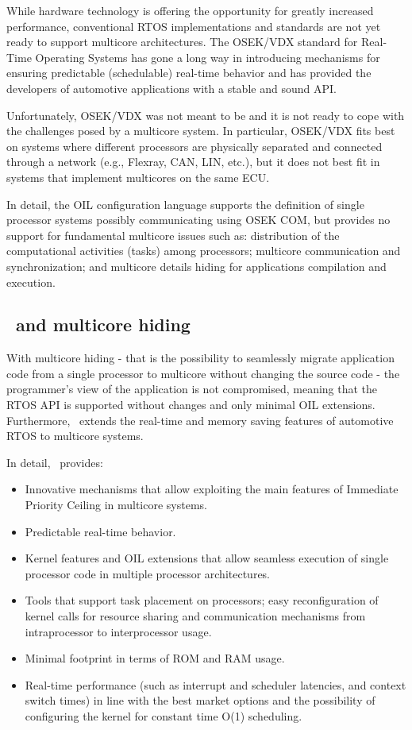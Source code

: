 While hardware technology is offering the opportunity for greatly
increased performance, conventional RTOS implementations and standards
are not yet ready to support multicore architectures. The
OSEK/VDX standard for Real-Time Operating Systems has gone a long way
in introducing mechanisms for ensuring predictable (schedulable)
real-time behavior and has provided the developers of automotive
applications with a stable and sound API.

Unfortunately, OSEK/VDX was not meant to be and it is not ready to
cope with the challenges posed by a multicore system.  In
particular, OSEK/VDX fits best on systems where different processors
are physically separated and connected through a network (e.g.,
Flexray, CAN, LIN, etc.), but it does not best fit in systems that
implement multicores on the same ECU.

In detail, the OIL configuration language supports the definition of
single processor systems possibly communicating using OSEK COM, but
provides no support for fundamental multicore issues such as:
distribution of the computational activities (tasks) among processors;
multicore communication and synchronization; and multicore
details hiding for applications compilation and execution.  

\subsection{\ee\ and multicore hiding}

With multicore hiding - that is the possibility to seamlessly
migrate application code from a single processor to multicore
without changing the source code - the programmer's view of the
application is not compromised, meaning that the RTOS API is supported
without changes and only minimal OIL extensions. Furthermore, \ee\ 
extends the real-time and memory saving features of automotive RTOS to
multicore systems.

In detail, \ee\ provides:
\begin{itemize}
\item Innovative mechanisms that allow exploiting the main features of
  Immediate Priority Ceiling in multicore systems.
\item Predictable real-time behavior.
\item Kernel features and OIL extensions that allow seamless execution
  of single processor code in multiple processor architectures.
\item Tools that support task placement on processors; easy
  reconfiguration of kernel calls for resource sharing and
  communication mechanisms from intraprocessor to interprocessor
  usage.
\item Minimal footprint in terms of ROM and RAM usage.
\item Real-time performance (such as interrupt and scheduler
  latencies, and context switch times) in line with the best market
  options and the possibility of configuring the kernel for constant
  time O(1) scheduling.
\end{itemize}

